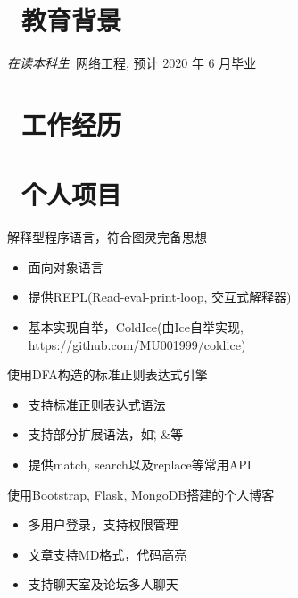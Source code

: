 \documentclass{resume}
\begin{document}


 
\section{\faGraduationCap\  教育背景}
\textit{在读本科生}\ 网络工程, 预计 2020 年 6 月毕业

\section{\faUsers\ 工作经历}
\role{实习}{深度学习实习生}

\section{\faGithubAlt\ 个人项目}
解释型程序语言，符合图灵完备思想
\begin{onehalfspacing}
\begin{itemize}
  \item 面向对象语言
  \item 提供REPL(Read-eval-print-loop, 交互式解释器)
  \item 基本实现自举，ColdIce(由Ice自举实现, https://github.com/MU001999/coldice)
\end{itemize}
\end{onehalfspacing}

使用DFA构造的标准正则表达式引擎
\begin{onehalfspacing}
\begin{itemize}
  \item 支持标准正则表达式语法
  \item 支持部分扩展语法，如\^, &等
  \item 提供match, search以及replace等常用API
\end{itemize}
\end{onehalfspacing}

使用Bootstrap, Flask, MongoDB搭建的个人博客
\begin{onehalfspacing}
\begin{itemize}
  \item 多用户登录，支持权限管理
  \item 文章支持MD格式，代码高亮
  \item 支持聊天室及论坛多人聊天
\end{itemize}
\end{onehalfspacing}
\end{document}
